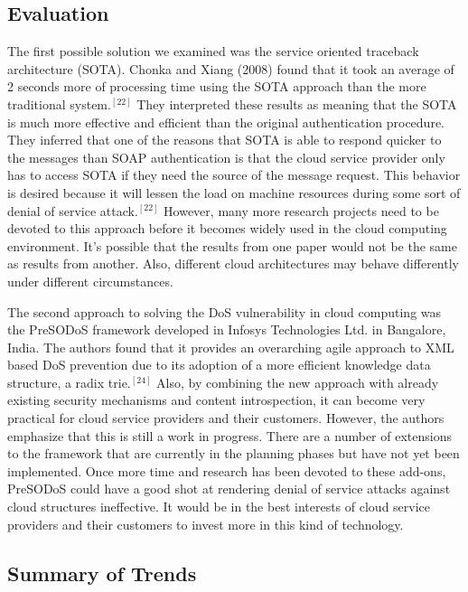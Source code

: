 \documentclass[a4paper, 8pt]{article} %
\begin{document}
\begin{doublespacing}
\subsection*{Evaluation}

The first possible solution we examined was the service oriented traceback architecture (SOTA).  Chonka and Xiang (2008) found that it took an average of 2 seconds more of processing time using the SOTA approach than the more traditional system.$^{[22]}$  They interpreted these results as meaning that the SOTA is much more effective and efficient than the original authentication procedure.  They inferred that one of the reasons that SOTA is able to respond quicker to the messages than SOAP authentication is that the cloud service provider only has to access SOTA if they need the source of the message request.  This behavior is desired because it will lessen the load on machine resources during some sort of denial of service attack.$^{[22]}$  However, many more research projects need to be devoted to this approach before it becomes widely used in the cloud computing environment.  It's possible that the results from one paper would not be the same as results from another.  Also, different cloud architectures may behave differently under different circumstances.  

The second approach to solving the DoS vulnerability in cloud computing was the PreSODoS framework developed in Infosys Technologies Ltd. in Bangalore, India.  The authors found that it provides an overarching agile approach to XML based DoS prevention due to its adoption of a more efficient knowledge data structure, a radix trie.$^{[24]}$  Also, by combining the new approach with already existing security mechanisms and content introspection, it can become very practical for cloud service providers and their customers.  However, the authors emphasize that this is still a work in progress.  There are a number of extensions to the framework that are currently in the planning phases but have not yet been implemented.  Once more time and research has been devoted to these add-ons, PreSODoS could have a good shot at rendering denial of service attacks against cloud structures ineffective.  It would be in the best interests of cloud service providers and their customers to invest more in this kind of technology.  

\subsection*{Summary of Trends}


\end{doublespacing}
\end{document}
